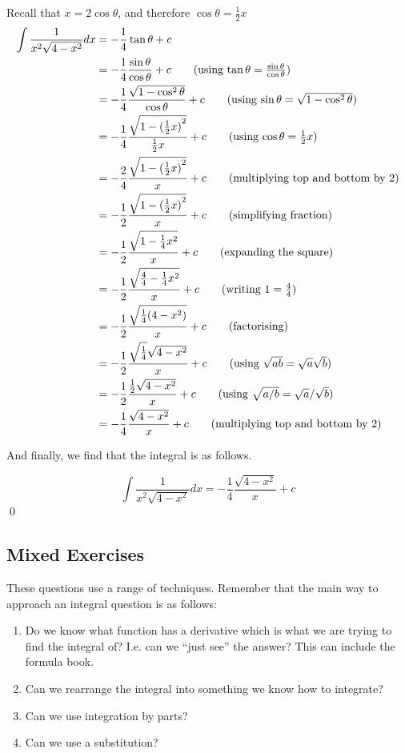 \begin{solution}
    Recall that $x = 2 \cos \theta$, and therefore $\cos \theta = \frac{1}{2}x$
    \begin{align*}
        \int \frac{1}{x^2\sqrt{4 - x^2}}dx &=  -\frac{1}{4}\tan \theta + c \\
        &= -\frac{1}{4}\frac{\sin \theta   }{\cos \theta}  + c \tag{using $\tan \theta = \frac{\sin \theta   }{\cos \theta} $}\\
        &= -\frac{1}{4}\frac{\sqrt{1 - \cos^2 \theta}}{\cos \theta}  + c \tag{using $\sin \theta = \sqrt{1 - \cos^2 \theta}$}\\
        &= -\frac{1}{4}\frac{\sqrt{1 - {(\frac{1}{2}x)}^2}}{\frac{1}{2}x}  + c \tag{using $\cos \theta = \frac{1}{2}x$}\\
        &= -\frac{2}{4}\frac{\sqrt{1 - {(\frac{1}{2}x)}^2}}{x}  + c \tag{multiplying top and bottom by $2$}\\
        &= -\frac{1}{2}\frac{\sqrt{1 - {(\frac{1}{2}x)}^2}}{x}  + c \tag{simplifying fraction}\\
        &= -\frac{1}{2}\frac{\sqrt{1 - \frac{1}{4}x^2}}{x}  + c \tag{expanding the square}\\
        &= -\frac{1}{2}\frac{\sqrt{\frac{4}{4} - \frac{1}{4}x^2}}{x}  + c \tag{writing $1 =\frac{4}{4}$}\\
        &= -\frac{1}{2}\frac{\sqrt{\frac{1}{4}(4 - x^2)}}{x}  + c \tag{factorising}\\
        &= -\frac{1}{2}\frac{\sqrt{\frac{1}{4}}\sqrt{4 - x^2}}{x}  + c \tag{using $\sqrt{ab} = \sqrt{a}\sqrt{b}$}\\
        &= -\frac{1}{2}\frac{\frac{1}{2}\sqrt{4 - x^2}}{x}  + c \tag{using $\sqrt{a/b} = \sqrt{a}/\sqrt{b}$}\\
        &= -\frac{1}{4}\frac{\sqrt{4 - x^2}}{x}  + c \tag{multiplying top and bottom by $2$}
    \end{align*}

    And finally, we find that the integral is as follows.

    \[\int \frac{1}{x^2\sqrt{4 - x^2}}dx  = -\frac{1}{4}\frac{\sqrt{4 - x^2}}{x}  + c \]
    \qed
\end{solution}


\subsection{Mixed Exercises}
These questions use a range of techniques.
Remember that the main way to approach an integral question is as follows:

\begin{enumerate}
    \item Do we know what function has a derivative which is what we are trying to find the integral of? I.e. can we ``just see'' the answer? This can include the formula book.
    \item Can we rearrange the integral into something we know how to integrate?
    \item Can we use integration by parts?
    \item Can we use a substitution?
\end{enumerate}

